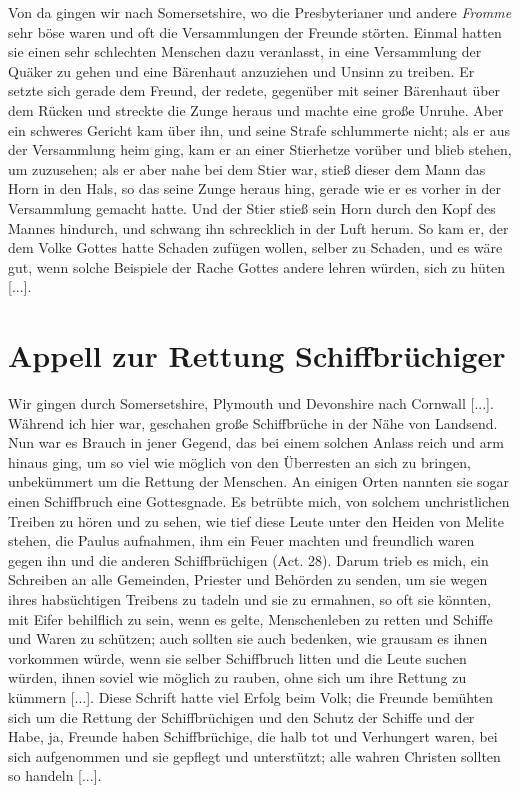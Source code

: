 Von da gingen wir nach Somersetshire, wo die Presbyterianer 
 und andere \textit{Fromme} sehr böse
waren und oft die Versammlungen der Freunde störten. Einmal
 
hatten sie einen sehr schlechten Menschen dazu veranlasst, 
in eine Versammlung der Quäker zu gehen und eine Bärenhaut 
anzuziehen und Unsinn zu treiben. Er setzte sich gerade dem Freund,
der redete, gegenüber mit seiner Bärenhaut über dem Rücken
und streckte die Zunge heraus und machte eine große Unruhe.
Aber ein schweres Gericht kam über ihn, und seine Strafe schlummerte
nicht; als er aus der Versammlung heim ging, kam er an einer
Stierhetze vorüber und blieb stehen, um zuzusehen; als er aber
nahe bei dem Stier war, stieß dieser dem Mann das Horn in
den Hals, so das seine Zunge heraus hing, gerade wie er es 
vorher in der Versammlung gemacht hatte. Und der Stier stieß
sein Horn durch den Kopf des Mannes hindurch, und schwang
ihn schrecklich in der Luft herum. So kam er, der dem Volke 
Gottes hatte Schaden zufügen wollen, selber zu Schaden, und
es wäre gut, wenn solche Beispiele der Rache Gottes andere lehren
würden, sich zu hüten [...].  

\section{Appell zur Rettung Schiffbrüchiger}

Wir gingen durch Somersetshire, 
Plymouth und Devonshire
nach Cornwall [...]. Während ich hier war, 
geschahen große Schiffbrüche in der Nähe von Landsend. 
Nun war es Brauch 
in jener Gegend, das bei einem solchen Anlass reich und arm
hinaus ging, um so viel wie möglich von den Überresten an
sich zu bringen, unbekümmert um die Rettung der Menschen. An
einigen Orten nannten sie sogar einen Schiffbruch eine 
Gottesgnade. Es betrübte mich, von 
solchem unchristlichen Treiben zu
hören und zu sehen, wie tief diese Leute unter den Heiden von
Melite stehen, die Paulus aufnahmen, ihm ein Feuer machten
und freundlich waren gegen ihn und die anderen Schiffbrüchigen
(Act. 28). Darum trieb es mich, ein Schreiben 
an alle Gemeinden,
Priester und Behörden zu senden, um sie wegen ihres habsüchtigen
Treibens zu tadeln und sie zu ermahnen, so oft sie könnten, mit
Eifer behilflich zu sein, wenn es gelte, Menschenleben zu retten
und Schiffe und Waren zu schützen; auch sollten sie auch bedenken, 
wie grausam es ihnen vorkommen würde, wenn sie selber
Schiffbruch litten und die Leute suchen würden, ihnen soviel wie
möglich zu rauben, ohne sich um ihre Rettung zu kümmern [...].
Diese Schrift hatte viel Erfolg beim Volk; die Freunde bemühten
sich um die Rettung der Schiffbrüchigen und den Schutz der
Schiffe und der Habe, ja, Freunde haben Schiffbrüchige, die halb
tot und Verhungert waren, bei sich aufgenommen und sie gepflegt
und unterstützt; alle wahren Christen sollten so handeln [...].

